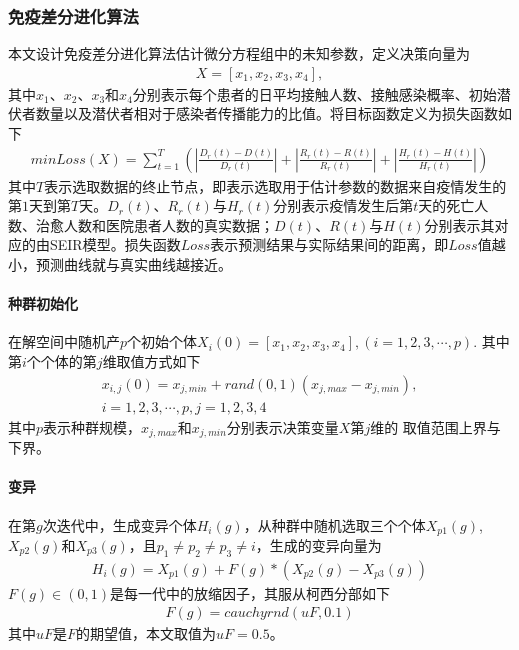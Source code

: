 \documentclass{whutmod}
\begin{document}
		\subsubsection{免疫差分进化算法}
		本文设计免疫差分进化算法估计微分方程组中的未知参数，定义决策向量为
		\begin{gather}
		X=[x_1,x_2,x_3,x_4],
		\end{gather}
		其中$x_1$、$x_2$、$x_3$和$x_4$分别表示每个患者的日平均接触人数、接触感染概率、初始潜伏者数量以及潜伏者相对于感染者传播能力的比值。将目标函数定义为损失函数如下
		\begin{gather}
		min Loss(X)=\sum_{t=1}^T (|\frac{D_r(t)-D(t)}{D_r(t)}|+|\frac{R_r(t)-R(t)}{R_r(t)}|+|\frac{H_r(t)-H(t)}{H_r(t)}|)
		\end{gather}
		其中$T$表示选取数据的终止节点，即表示选取用于估计参数的数据来自疫情发生的第$1$天到第$T$天。$D_r(t)$、$R_r(t)$与$H_r(t)$分别表示疫情发生后第$t$天的死亡人数、治愈人数和医院患者人数的真实数据；$D(t)$、$R(t)$与$H(t)$分别表示其对应的由SEIR模型。损失函数$Loss$表示预测结果与实际结果间的距离，即$Loss$值越小，预测曲线就与真实曲线越接近。
		\paragraph{种群初始化}
		在解空间中随机产$p$个初始个体$
		X_i(0)=[x_1,x_2,x_3,x_4],(i=1,2,3,\cdots,p).
		$
		其中第$i$个个体的第$j$维取值方式如下
		\begin{gather*}
		x_{i,j}(0)=x_{j,min}+rand(0,1)(x_{j,max}-x_{j,min}),\\i=1,2,3,\cdots,p,j=1,2,3,4
		\end{gather*}
		其中$p$表示种群规模，$x_{j,max}$和$x_{j,min}$分别表示决策变量$X$第$j$维的
		取值范围上界与下界。
		\paragraph{变异}
		在第$g$次迭代中，生成变异个体$H_i(g)$，从种群中随机选取三个个体$X_{p1}(g)$,$X_{p2}(g)$和$X_{p3}(g)$，且$p_1\neq p_2\neq p_3\neq i$，生成的变异向量为
	    \begin{gather}
	    H_i(g)=X_{p1}(g)+F(g)*(X_{p2}(g)-X_{p3}(g))
	    \end{gather}
	    $F(g)\in (0,1)$是每一代中的放缩因子，其服从柯西分部如下
	    \begin{gather*}
	    F(g)=cauchyrnd(uF,0.1)
	    \end{gather*}
	   其中$uF$是$F$的期望值，本文取值为$uF=0.5$。
\end{document}
